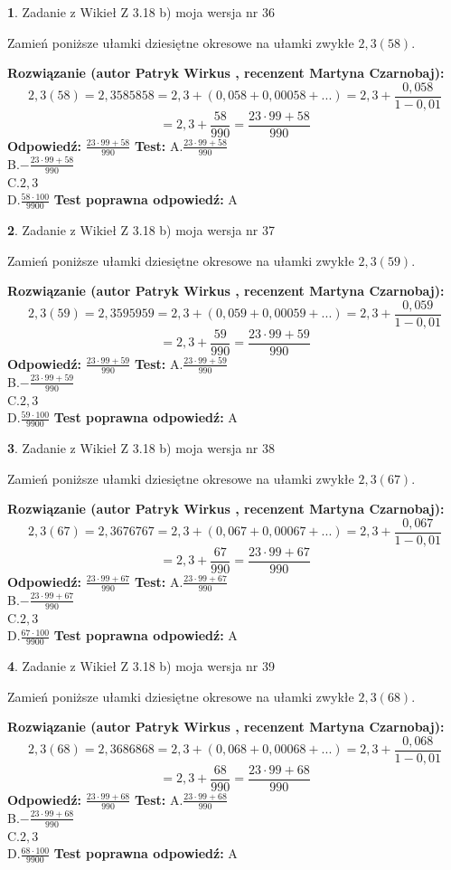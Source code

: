 \documentclass[12pt, a4paper]{article}
\theoremstyle{definition} %
\newtheorem{zad}{}
\newcommand{\zadStart}[1]{\begin{zad}#1\newline}
\newcommand{\zadStop}{\end{zad}}
\newcommand{\rozwStart}[2]{\noindent \textbf{Rozwiązanie (autor #1 , recenzent #2): }\newline}
\newcommand{\rozwStop}{\newline}
\newcommand{\odpStart}{\noindent \textbf{Odpowiedź:}\newline}
\newcommand{\odpStop}{\newline}
\newcommand{\testStart}{\noindent \textbf{Test:}\newline}
\newcommand{\testStop}{\newline}
\newcommand{\kluczStart}{\noindent \textbf{Test poprawna odpowiedź:}\newline}
\newcommand{\kluczStop}{\newline}
\begin{document}
\zadStart{Zadanie z Wikieł Z 3.18 b) moja wersja nr 36}

Zamień poniższe ułamki dziesiętne okresowe na ułamki zwykłe $2,3(58)$.
\zadStop
\rozwStart{Patryk Wirkus}{Martyna Czarnobaj}
$$2,3(58)=2,3585858=2,3+(0,058+0,00058+...)=2,3+\frac{0,058}{1-0,01}$$
$$=2,3+\frac{58}{990}=\frac{23\cdot99+58}{990}$$
\rozwStop
\odpStart
$\frac{23\cdot99+58}{990}$
\odpStop
\testStart
A.$\frac{23\cdot99+58}{990}$\\ B.$-\frac{23\cdot99+58}{990}$\\ C.$2,3$\\ D.$\frac{58\cdot100}{9900}$
\testStop
\kluczStart
A
\kluczStop



\zadStart{Zadanie z Wikieł Z 3.18 b) moja wersja nr 37}

Zamień poniższe ułamki dziesiętne okresowe na ułamki zwykłe $2,3(59)$.
\zadStop
\rozwStart{Patryk Wirkus}{Martyna Czarnobaj}
$$2,3(59)=2,3595959=2,3+(0,059+0,00059+...)=2,3+\frac{0,059}{1-0,01}$$
$$=2,3+\frac{59}{990}=\frac{23\cdot99+59}{990}$$
\rozwStop
\odpStart
$\frac{23\cdot99+59}{990}$
\odpStop
\testStart
A.$\frac{23\cdot99+59}{990}$\\ B.$-\frac{23\cdot99+59}{990}$\\ C.$2,3$\\ D.$\frac{59\cdot100}{9900}$
\testStop
\kluczStart
A
\kluczStop



\zadStart{Zadanie z Wikieł Z 3.18 b) moja wersja nr 38}

Zamień poniższe ułamki dziesiętne okresowe na ułamki zwykłe $2,3(67)$.
\zadStop
\rozwStart{Patryk Wirkus}{Martyna Czarnobaj}
$$2,3(67)=2,3676767=2,3+(0,067+0,00067+...)=2,3+\frac{0,067}{1-0,01}$$
$$=2,3+\frac{67}{990}=\frac{23\cdot99+67}{990}$$
\rozwStop
\odpStart
$\frac{23\cdot99+67}{990}$
\odpStop
\testStart
A.$\frac{23\cdot99+67}{990}$\\ B.$-\frac{23\cdot99+67}{990}$\\ C.$2,3$\\ D.$\frac{67\cdot100}{9900}$
\testStop
\kluczStart
A
\kluczStop



\zadStart{Zadanie z Wikieł Z 3.18 b) moja wersja nr 39}

Zamień poniższe ułamki dziesiętne okresowe na ułamki zwykłe $2,3(68)$.
\zadStop
\rozwStart{Patryk Wirkus}{Martyna Czarnobaj}
$$2,3(68)=2,3686868=2,3+(0,068+0,00068+...)=2,3+\frac{0,068}{1-0,01}$$
$$=2,3+\frac{68}{990}=\frac{23\cdot99+68}{990}$$
\rozwStop
\odpStart
$\frac{23\cdot99+68}{990}$
\odpStop
\testStart
A.$\frac{23\cdot99+68}{990}$\\ B.$-\frac{23\cdot99+68}{990}$\\ C.$2,3$\\ D.$\frac{68\cdot100}{9900}$
\testStop
\kluczStart
A
\kluczStop
\end{document}
